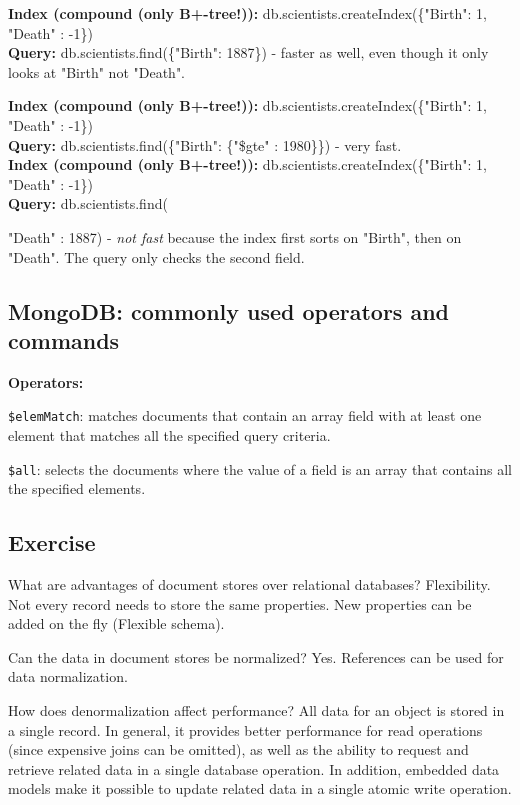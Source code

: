 \documentclass[11pt,oneside,a4paper]{article}
\begin{document}
\textbf{Index (compound (only B+-tree!)):} db.scientists.createIndex(\{"Birth": 1, "Death" : -1\})\\
\textbf{Query:} db.scientists.find(\{"Birth": 1887\}) - faster as well, even though it only looks at "Birth" not "Death".\\

\newpage

\textbf{Index (compound (only B+-tree!)):} db.scientists.createIndex(\{"Birth": 1, "Death" : -1\})\\
\textbf{Query:} db.scientists.find(\{"Birth": \{"\$gte" : 1980\}\}) - very fast.\\

\textbf{Index (compound (only B+-tree!)):} db.scientists.createIndex(\{"Birth": 1, "Death" : -1\})\\
\textbf{Query:} db.scientists.find({"Death" : 1887) - \textit{not fast} because the index first sorts on "Birth", then on "Death". The query only checks the second field.\\

\subsection{MongoDB: commonly used operators and commands}

\textbf{Operators:}

\begin{compactitem}
\item \texttt{\$elemMatch}: matches documents that contain an array field with at least one element that matches all the specified query criteria.
\item \texttt{\$all}: selects the documents where the value of a field is an array that contains all the specified elements.
\end{compactitem}

\subsection{Exercise}

What are advantages of document stores over relational databases?  Flexibility. Not every record needs to store the same properties. New properties can be added on the fly (Flexible schema).

Can the data in document stores be normalized? Yes. References can be used for data normalization.

How does denormalization affect performance? All data for an object is stored in a single record. In general, it provides better performance for read operations (since expensive joins can be omitted), as well as the ability to request and retrieve related data in a single database operation. In addition, embedded
data models make it possible to update related data in a single atomic write operation.

}
\end{document}
